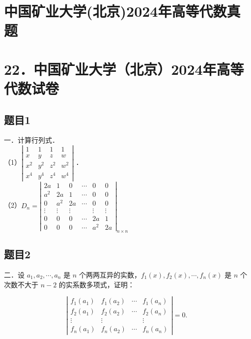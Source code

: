 \documentclass{article}
\begin{document}
\section*{中国矿业大学(北京)2024年高等代数真题}
\section*{22．中国矿业大学（北京）2024年高等代数试卷}

\subsection{题目1}
一．计算行列式．\\
（1）\(\left|\begin{array}{cccc}1 & 1 & 1 & 1 \\ x & y & z & w \\ x^{2} & y^{2} & z^{2} & w^{2} \\ x^{4} & y^{4} & z^{4} & w^{4}\end{array}\right|\) ．\\
（2）\(D_{n}=\left|\begin{array}{cccccc}2 a & 1 & 0 & \cdots & 0 & 0 \\ a^{2} & 2 a & 1 & \cdots & 0 & 0 \\ 0 & a^{2} & 2 a & \cdots & 0 & 0 \\ \vdots & \vdots & \vdots & & \vdots & \vdots \\ 0 & 0 & 0 & \cdots & 2 a & 1 \\ 0 & 0 & 0 & \cdots & a^{2} & 2 a\end{array}\right|_{n \times n}\)

\subsection{题目2}
二．设 \(a_{1}, a_{2}, \cdots, a_{n}\) 是 \(n\) 个两两互异的实数，\(f_{1}(x), f_{2}(x), \cdots, f_{n}(x)\) 是 \(n\) 个次数不大于 \(n-2\) 的实系数多项式，证明：

\[
\left|\begin{array}{cccc}
f_{1}\left(a_{1}\right) & f_{1}\left(a_{2}\right) & \cdots & f_{1}\left(a_{n}\right) \\
f_{2}\left(a_{1}\right) & f_{2}\left(a_{2}\right) & \cdots & f_{2}\left(a_{n}\right) \\
\vdots & \vdots & & \vdots \\
f_{n}\left(a_{1}\right) & f_{n}\left(a_{2}\right) & \cdots & f_{n}\left(a_{n}\right)
\end{array}\right|=0 \text {. }
\]
\end{document}

